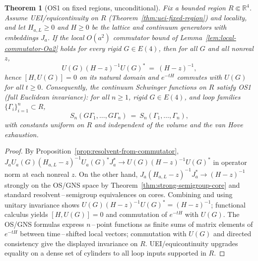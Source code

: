 \documentclass[11pt]{amsart}
\theoremstyle{plain}
\newtheorem{theorem}{Theorem}[section]
\theoremstyle{definition}
\theoremstyle{remark}
\begin{document}
\begin{theorem}[OS1 on fixed regions, unconditional]\label{thm:os1-unconditional}
Fix a bounded region $R\Subset\mathbb R^4$. Assume UEI/equicontinuity on $R$ (Theorem~\ref{thm:uei-fixed-region}) and locality, and let $H_{a,L}\ge 0$ and $H\ge 0$ be the lattice and continuum generators with embeddings $J_a$. If the local $O(a^2)$ commutator bound of Lemma~\ref{lem:local-commutator-Oa2} holds for every rigid $G\in E(4)$, then for all $G$ and all nonreal $z$,
\[
  U(G)(H-z)^{-1}U(G)^*\ =\ (H-z)^{-1},
\]
hence $[H,U(G)]=0$ on its natural domain and $e^{-tH}$ commutes with $U(G)$ for all $t\ge 0$. Consequently, the continuum Schwinger functions on $R$ satisfy OS1 (full Euclidean invariance): for all $n\ge 1$, rigid $G\in E(4)$, and loop families $\{\Gamma_i\}_{i=1}^n\subset R$,
\[
  S_n(G\Gamma_1,\dots,G\Gamma_n)\ =\ S_n(\Gamma_1,\dots,\Gamma_n),
\]
with constants uniform on $R$ and independent of the volume and the van Hove exhaustion.
\end{theorem}
\begin{proof}
By Proposition~\ref{prop:resolvent-from-commutator}, $J_a U_a(G)(H_{a,L}-z)^{-1}U_a(G)^*J_a^*\to U(G)(H-z)^{-1}U(G)^*$ in operator norm at each nonreal $z$. On the other hand, $J_a(H_{a,L}-z)^{-1}J_a^*\to (H-z)^{-1}$ strongly on the OS/GNS space by Theorem~\ref{thm:strong-semigroup-core} and standard resolvent\,–\,semigroup equivalences on cores. Combining and using unitary invariance shows $U(G)(H-z)^{-1}U(G)^*=(H-z)^{-1}$; functional calculus yields $[H,U(G)]=0$ and commutation of $e^{-tH}$ with $U(G)$. The OS/GNS formulas express $n$\,–\,point functions as finite sums of matrix elements of $e^{-tH}$ between time\,–\,shifted local vectors; commutation with $U(G)$ and directed consistency give the displayed invariance on $R$. UEI/equicontinuity upgrades equality on a dense set of cylinders to all loop inputs supported in $R$.
\end{proof}
\end{document}
